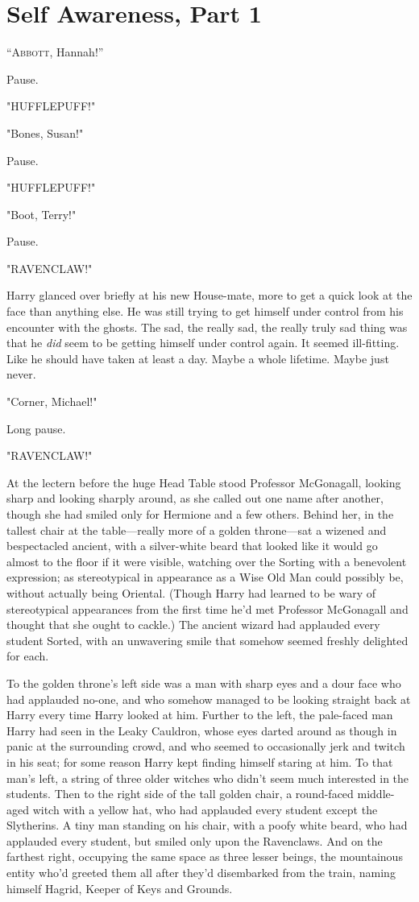 \chapter{Self Awareness, Part 1}

\lettrine{“A}{bbott}, Hannah!''

Pause.

"HUFFLEPUFF!"

"Bones, Susan!"

Pause.

"HUFFLEPUFF!"

"Boot, Terry!"

Pause.

"RAVENCLAW!"

Harry glanced over briefly at his new House-mate, more to get a quick look at
the face than anything else. He was still trying to get himself under control
from his encounter with the ghosts. The sad, the really sad, the really truly
sad thing was that he \emph{did} seem to be getting himself under control
again. It seemed ill-fitting. Like he should have taken at least a day. Maybe a
whole lifetime. Maybe just never.

"Corner, Michael!"

Long pause.

"RAVENCLAW!"

At the lectern before the huge Head Table stood Professor McGonagall, looking
sharp and looking sharply around, as she called out one name after another,
though she had smiled only for Hermione and a few others. Behind her, in the
tallest chair at the table—really more of a golden throne—sat a wizened and
bespectacled ancient, with a silver-white beard that looked like it would go
almost to the floor if it were visible, watching over the Sorting with a
benevolent expression; as stereotypical in appearance as a Wise Old Man could
possibly be, without actually being Oriental. (Though Harry had learned to be
wary of stereotypical appearances from the first time he'd met Professor
McGonagall and thought that she ought to cackle.) The ancient wizard had
applauded every student Sorted, with an unwavering smile that somehow seemed
freshly delighted for each.

To the golden throne's left side was a man with sharp eyes and a dour face who
had applauded no-one, and who somehow managed to be looking straight back at
Harry every time Harry looked at him. Further to the left, the pale-faced man
Harry had seen in the Leaky Cauldron, whose eyes darted around as though in
panic at the surrounding crowd, and who seemed to occasionally jerk and twitch
in his seat; for some reason Harry kept finding himself staring at him. To that
man's left, a string of three older witches who didn't seem much interested in
the students. Then to the right side of the tall golden chair, a round-faced
middle-aged witch with a yellow hat, who had applauded every student except the
Slytherins. A tiny man standing on his chair, with a poofy white beard, who had
applauded every student, but smiled only upon the Ravenclaws. And on the
farthest right, occupying the same space as three lesser beings, the
mountainous entity who'd greeted them all after they'd disembarked from the
train, naming himself Hagrid, Keeper of Keys and Grounds.

